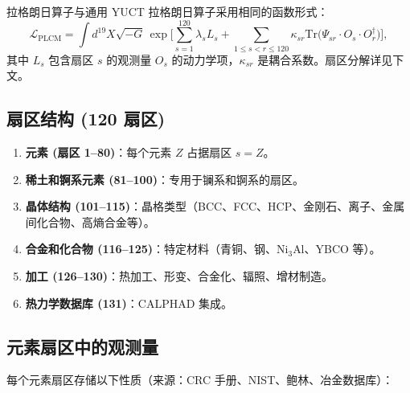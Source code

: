 \documentclass[12pt,a4paper]{article}
\begin{document}
	拉格朗日算子与通用 YUCT 拉格朗日算子采用相同的函数形式：
	\[
	\mathcal{L}_{\text{PLCM}} = \int d^{19}X \sqrt{-G} \,
	\exp\Bigg[ \sum_{s=1}^{120} \lambda_s L_s + \sum_{1\le s<r\le 120} \kappa_{sr} \mathrm{Tr}\big(\Psi_{sr} \cdot O_s \cdot O_r^\dagger\big) \Bigg],
	\]
	其中 \(L_s\) 包含扇区 \(s\) 的观测量 \(O_s\) 的动力学项，\(\kappa_{sr}\) 是耦合系数。扇区分解详见下文。
	
	\subsection{扇区结构 (120 扇区)}
	
	\begin{enumerate}
		\item \textbf{元素 (扇区 1–80)}：每个元素 \(Z\) 占据扇区 \(s=Z\)。
		\item \textbf{稀土和锕系元素 (81–100)}：专用于镧系和锕系的扇区。
		\item \textbf{晶体结构 (101–115)}：晶格类型（BCC、FCC、HCP、金刚石、离子、金属间化合物、高熵合金等）。
		\item \textbf{合金和化合物 (116–125)}：特定材料（青铜、钢、Ni\(_{3}\)Al、YBCO 等）。
		\item \textbf{加工 (126–130)}：热加工、形变、合金化、辐照、增材制造。
		\item \textbf{热力学数据库 (131)}：CALPHAD 集成。
	\end{enumerate}
	
	\subsection{元素扇区中的观测量}
	
	每个元素扇区存储以下性质（来源：CRC 手册、NIST、鲍林、冶金数据库）：
	
\end{document}
